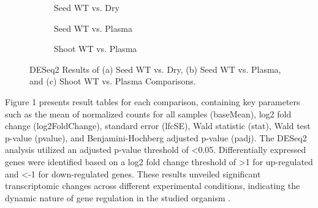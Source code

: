 \documentclass[12pt,letterpaper]{article}
\begin{document}
\begin{figure}[H]
\begin{subfigure}{\textwidth}
    \centering
    \caption{Seed WT vs. Dry}
    \label{fig:enter-label}
\end{subfigure}\par
\begin{subfigure}{\textwidth}
    \centering
    \caption{Seed WT vs. Plasma}
    \label{fig:enter-label}
\end{subfigure}\par
\begin{subfigure}{\textwidth}
    \centering
    \caption{Shoot WT vs. Plasma}
    \label{fig:enter-label}
\end{subfigure}
\caption{DESeq2 Results of (a) Seed WT vs. Dry, (b) Seed WT vs. Plasma, and (c) Shoot WT vs. Plasma Comparisons.}
\end{figure}

Figure 1 presents result tables for each comparison, containing key parameters such as the mean of normalized counts for all samples (baseMean), log2 fold change (log2FoldChange), standard error (lfcSE), Wald statistic (stat), Wald test p-value (pvalue), and Benjamini-Hochberg adjusted p-value (padj). The DESeq2 analysis utilized an adjusted p-value threshold of \textless 0.05. Differentially expressed genes were identified based on a log2 fold change threshold of \textgreater 1 for up-regulated and \textless -1 for down-regulated genes. These results unveiled significant transcriptomic changes across different experimental conditions, indicating the dynamic nature of gene regulation in the studied organism \parencite{deseq2}.
\end{document}
